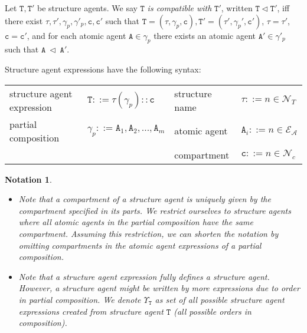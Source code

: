 \documentclass{entcs}
\renewcommand{\~}[0]{\texttildelow}
\newtheorem{notation}[thm]{Notation}
\begin{document}
\begin{defn}
Let $\mathtt{T},\mathtt{T}'$ be structure agents. We say $\mathtt{T}$ \emph{is compatible with} $\mathtt{T}'$, written $\mathtt{T} \lhd \mathtt{T}'$, iff there exist $\tau,\tau',\gamma_p,\gamma'_p,\mathtt{c},\mathtt{c}'$ such that $\mathtt{T}=(\tau, \gamma_p, \mathtt{c}),\mathtt{T}'=(\tau', \gamma_p', \mathtt{c}')$, $\tau = \tau'$, $\mathtt{c} = \mathtt{c}'$, and for each atomic agent $\mathtt{A} \in \gamma_p$ there exists an atomic agent $\mathtt{A}' \in \gamma'_p$ such that $\mathtt{A}~\lhd~\mathtt{A}'$. 
\end{defn}

Structure agent expressions have the following syntax:

\begin{center}
{\small
\hspace*{-1cm}\begin{tabular}{ l l l l }
 structure agent expression & $\mathtt{T} ::= \tau(\gamma_p)::\mathtt{c}$ & structure name & $\tau ::= n \in \mathcal{N}_{T}$\\
 partial composition & $\gamma_p ::= \mathtt{A}_1, \mathtt{A}_2, ..., \mathtt{A}_m$ & atomic agent & $\mathtt{A}_i ::= n \in \mathcal{E}_\mathcal{A}$\\
 & & compartment & $\mathtt{c} ::= n \in \mathcal{N}_{c}$\\
\end{tabular}
}
\end{center}   

\begin{notation}
~
\begin{itemize}
\item Note that a compartment of a structure agent is uniquely given by the compartment specified in its parts. We restrict ourselves to structure agents where all atomic agents in the partial composition have the same compartment. Assuming this restriction, we can shorten the notation by omitting compartments in the atomic agent expressions of a partial composition. 
\item Note that a structure agent expression fully defines a structure agent. However, a structure agent might be written by more expressions due to order in partial composition. We denote $\Upsilon_\mathtt{T}$ as set of all possible structure agent expressions created from structure agent $\mathtt{T}$ (all possible orders in composition).
\end{itemize}
\end{notation}
\end{document}
